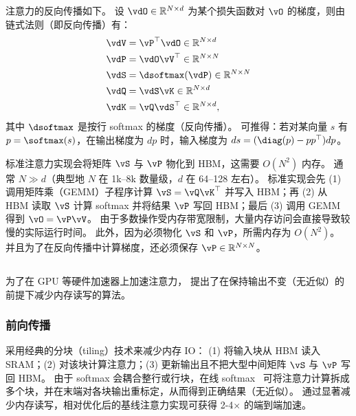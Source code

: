 注意力的反向传播如下。
设 $\vdO \in \mathbb{R}^{N \times d}$ 为某个损失函数对 $\vO$ 的梯度，则由链式法则（即反向传播）有：
\begin{align*}
  \vdV &= \vP^\top \vdO \in \mathbb{R}^{N \times d} \\
  \vdP &= \vdO \vV^\top \in \mathbb{R}^{N \times N} \\
  \vdS &= \dsoftmax (\vdP) \in \mathbb{R}^{N \times N} \\
  \vdQ &= \vdS \vK \in \mathbb{R}^{N \times d} \\
  \vdK &= \vQ \vdS^\top \in \mathbb{R}^{N \times d},
\end{align*}
其中 $\dsoftmax$ 是按行 softmax 的梯度（反向传播）。
可推得：若对某向量 $s$ 有 $p=\softmax(s)$，在输出梯度为 $dp$ 时，输入梯度为 $ds=(\diag(p)-pp^\top)dp$。

标准注意力实现会将矩阵 $\vS$ 与 $\vP$ 物化到 HBM，这需要 $O(N^2)$ 内存。
通常 $N \gg d$（典型地 $N$ 在 1k--8k 数量级，$d$ 在 64--128 左右）。
标准实现会先 (1) 调用矩阵乘（GEMM）子程序计算 $\vS=\vQ\vK^\top$ 并写入 HBM；再 (2) 从 HBM 读取 $\vS$ 计算 softmax 并将结果 $\vP$ 写回 HBM；最后 (3) 调用 GEMM 得到 $\vO=\vP\vV$。
由于多数操作受内存带宽限制，大量内存访问会直接导致较慢的实际运行时间。
此外，因为必须物化 $\vS$ 和 $\vP$，所需内存为 $O(N^2)$。
并且为了在反向传播中计算梯度，还必须保存 $\vP \in \mathbb{R}^{N\times N}$。

\subsection{\sysnameone}
\label{subsec:flashv1}

为了在 GPU 等硬件加速器上加速注意力，\citep{dao2022flashattention} 提出了在保持输出不变（无近似）的前提下减少内存读写的算法。

\subsubsection{前向传播}
\sysnameone 采用经典的分块（tiling）技术来减少内存 IO：
(1) 将输入块从 HBM 读入 SRAM；(2) 对该块计算注意力；(3) 更新输出且不把大型中间矩阵 $\vS$ 与 $\vP$ 写回 HBM。
由于 softmax 会耦合整行或行块，在线 softmax~\citep{milakov2018online, rabe2021self} 可将注意力计算拆成多个块，并在末端对各块输出重标定，从而得到正确结果（无近似）。
通过显著减少内存读写，\sysnameone 相对优化后的基线注意力实现可获得 2-4$\times$ 的端到端加速。


